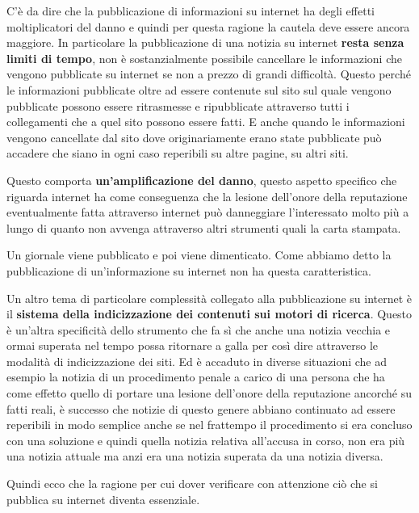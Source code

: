 C'è da dire che la pubblicazione di informazioni su internet ha degli effetti moltiplicatori del danno e quindi per questa ragione la cautela deve essere ancora maggiore. In particolare la pubblicazione di una notizia su internet \textbf{resta senza limiti di tempo}, non è sostanzialmente possibile cancellare le informazioni che vengono pubblicate su internet se non a prezzo di grandi difficoltà. Questo perché le informazioni pubblicate oltre ad essere contenute sul sito sul quale vengono pubblicate possono essere ritrasmesse e ripubblicate attraverso tutti i collegamenti che a quel sito possono essere fatti. E anche quando le informazioni vengono cancellate dal sito dove originariamente erano state pubblicate può accadere che siano in ogni caso reperibili su altre pagine, su altri siti.\par
Questo comporta \textbf{un'amplificazione del danno}, questo aspetto specifico che riguarda internet ha come conseguenza che la lesione dell'onore della reputazione eventualmente fatta attraverso internet può danneggiare l'interessato molto più a lungo di quanto non avvenga attraverso altri strumenti quali la carta stampata.\par
Un giornale viene pubblicato e poi viene dimenticato. Come abbiamo detto la pubblicazione di un'informazione su internet non ha questa caratteristica.\par
Un altro tema di particolare complessità collegato alla pubblicazione su internet è il \textbf{sistema della indicizzazione dei contenuti sui motori di ricerca}. Questo è un'altra specificità dello strumento che fa sì che anche una notizia vecchia e ormai superata nel tempo possa ritornare a galla per così dire attraverso le modalità di indicizzazione dei siti. Ed è accaduto in diverse situazioni che ad esempio la notizia di un procedimento penale a carico di una persona che ha come effetto quello di portare una lesione dell'onore della reputazione ancorché su fatti reali, è successo che notizie di questo genere abbiano continuato ad essere reperibili in modo semplice anche se nel frattempo il procedimento si era concluso con una soluzione e quindi quella notizia relativa all'accusa in corso, non era più una notizia attuale ma anzi era una notizia superata da una notizia diversa. \par

Quindi ecco che la ragione per cui dover verificare con attenzione ciò che si pubblica su internet diventa essenziale.\par

